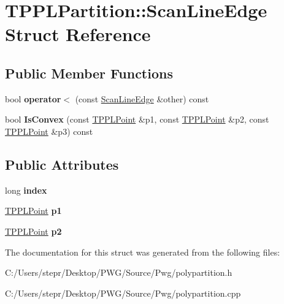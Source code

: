 \hypertarget{struct_t_p_p_l_partition_1_1_scan_line_edge}{}\section{T\+P\+P\+L\+Partition\+:\+:Scan\+Line\+Edge Struct Reference}
\label{struct_t_p_p_l_partition_1_1_scan_line_edge}
\subsection*{Public Member Functions}
\begin{DoxyCompactItemize}
\item 
\mbox{\label{struct_t_p_p_l_partition_1_1_scan_line_edge_afda0202241b260e83646436e87232dfa}} 
bool {\bfseries operator$<$} (const \mbox{\hyperlink{struct_t_p_p_l_partition_1_1_scan_line_edge}{Scan\+Line\+Edge}} \&other) const
\item 
\mbox{\label{struct_t_p_p_l_partition_1_1_scan_line_edge_a7ffc57dc60ac0a8b85234dab4745a83b}} 
bool {\bfseries Is\+Convex} (const \mbox{\hyperlink{struct_t_p_p_l_point}{T\+P\+P\+L\+Point}} \&p1, const \mbox{\hyperlink{struct_t_p_p_l_point}{T\+P\+P\+L\+Point}} \&p2, const \mbox{\hyperlink{struct_t_p_p_l_point}{T\+P\+P\+L\+Point}} \&p3) const
\end{DoxyCompactItemize}
\subsection*{Public Attributes}
\begin{DoxyCompactItemize}
\item 
\mbox{\label{struct_t_p_p_l_partition_1_1_scan_line_edge_a4775461dc02c0741914c87c0f8120deb}} 
long {\bfseries index}
\item 
\mbox{\label{struct_t_p_p_l_partition_1_1_scan_line_edge_a0f4ff0b340ddc4b46d34389bbc1467df}} 
\mbox{\hyperlink{struct_t_p_p_l_point}{T\+P\+P\+L\+Point}} {\bfseries p1}
\item 
\mbox{\label{struct_t_p_p_l_partition_1_1_scan_line_edge_a23ed7277f3c39569a45299d9bba1792c}} 
\mbox{\hyperlink{struct_t_p_p_l_point}{T\+P\+P\+L\+Point}} {\bfseries p2}
\end{DoxyCompactItemize}


The documentation for this struct was generated from the following files\+:\begin{DoxyCompactItemize}
\item 
C\+:/\+Users/stepr/\+Desktop/\+P\+W\+G/\+Source/\+Pwg/polypartition.\+h\item 
C\+:/\+Users/stepr/\+Desktop/\+P\+W\+G/\+Source/\+Pwg/polypartition.\+cpp\end{DoxyCompactItemize}
